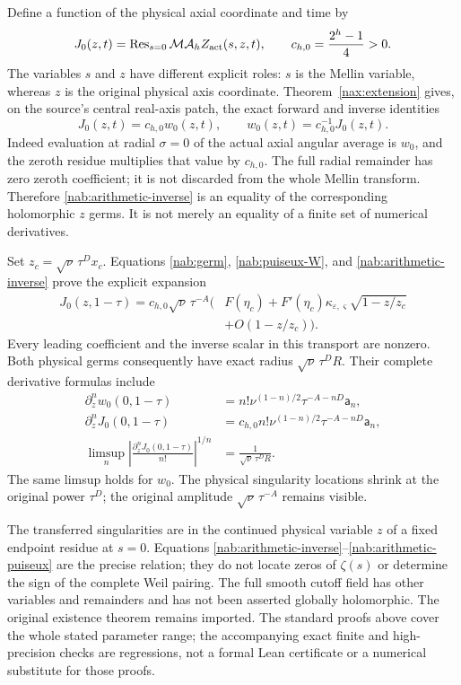 Define a function of the physical axial coordinate and time by
\[
 J_0(z,t)=\operatorname{Res}_{s=0}
                \mathcal M\mathcal A_h Z_{\rm act}(s,z,t),
 \qquad c_{h,0}=\frac{2^h-1}{4}>0.
\]
The variables $s$ and $z$ have different explicit roles: $s$ is the
Mellin variable, whereas $z$ is the original physical axis coordinate.
Theorem~\ref{nax:extension} gives, on the source's central real-axis
patch, the exact forward and inverse identities
\begin{equation}\label{nab:arithmetic-inverse}
 J_0(z,t)=c_{h,0}w_0(z,t),\qquad
 w_0(z,t)=c_{h,0}^{-1}J_0(z,t).
\end{equation}
Indeed evaluation at radial $\sigma=0$ of the actual axial angular
average is $w_0$, and the zeroth residue multiplies that value by
$c_{h,0}$. The full radial remainder has zero zeroth coefficient;
it is not discarded from the whole Mellin transform. Therefore
\eqref{nab:arithmetic-inverse} is an equality of the corresponding
holomorphic $z$ germs. It is not merely an equality of a finite set
of numerical derivatives.

Set $z_c=\sqrt\nu\,\tau^D x_c$. Equations
\eqref{nab:germ}, \eqref{nab:puiseux-W}, and
\eqref{nab:arithmetic-inverse} prove the explicit expansion
\begin{equation}\label{nab:arithmetic-puiseux}
 \begin{split}
 J_0(z,1-\tau)=c_{h,0}\sqrt\nu\,\tau^{-A}
 \bigl(&F(\eta_c)+F'(\eta_c)\kappa_{\varepsilon,\varsigma}
                       \sqrt{1-z/z_c}\\
       &+O(1-z/z_c)\bigr).
 \end{split}
\end{equation}
Every leading coefficient and the inverse scalar in this transport
are nonzero. Both physical germs consequently have exact radius
$\sqrt\nu\,\tau^D R$. Their complete derivative formulas include
\begin{equation}\label{nab:physical-limsup}
 \begin{split}
 \partial_z^nw_0(0,1-\tau)
     &=n!\nu^{(1-n)/2}\tau^{-A-nD}\mathsf a_n,\\
 \partial_z^nJ_0(0,1-\tau)
     &=c_{h,0}n!\nu^{(1-n)/2}\tau^{-A-nD}\mathsf a_n,\\
 \limsup_n\left|\frac{\partial_z^nJ_0(0,1-\tau)}{n!}\right|^{1/n}
     &=\frac1{\sqrt\nu\,\tau^D R}.
 \end{split}
\end{equation}
The same limsup holds for $w_0$. The physical singularity locations
shrink at the original power $\tau^D$; the original amplitude
$\sqrt\nu\,\tau^{-A}$ remains visible.

The transferred singularities are in the continued physical variable
$z$ of a fixed endpoint residue at $s=0$. Equations
\eqref{nab:arithmetic-inverse}--\eqref{nab:arithmetic-puiseux} are the
precise relation; they do not locate zeros of $\zeta(s)$ or determine
the sign of the complete Weil pairing. The full smooth cutoff field
has other variables and remainders and has not been asserted globally
holomorphic. The original existence theorem remains imported. The
standard proofs above cover the whole stated parameter range; the
accompanying exact finite and high-precision checks are regressions,
not a formal Lean certificate or a numerical substitute for those proofs.
